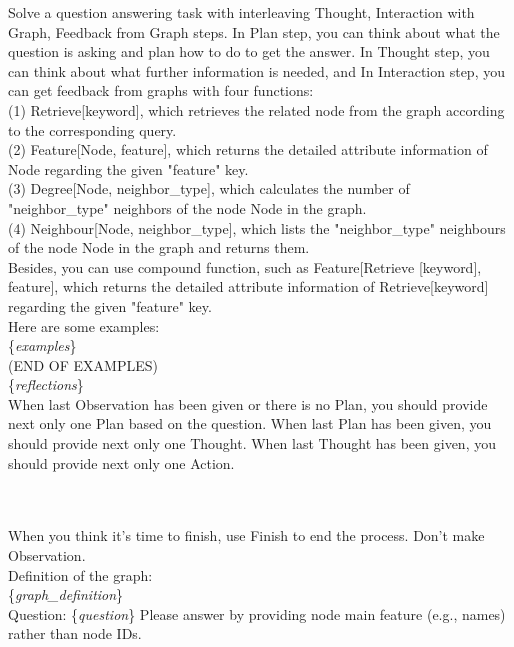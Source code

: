 \documentclass[11pt]{article}
\begin{document}
\begin{tcolorbox}[colback=white!10!white, colframe=blue!30!black, title=Reasoning Prompts, boxrule=1pt]
\justifying
\noindent
Solve a question answering task with interleaving Thought, Interaction with Graph, Feedback from Graph steps. In Plan step, you can think about what the question is asking and plan how to do to get the answer. In Thought step, you can think about what further information is needed, and In Interaction step, you can get feedback from graphs with four functions: \\
(1) Retrieve[keyword], which retrieves the related node from the graph according to the corresponding query.\\
(2) Feature[Node, feature], which returns the detailed attribute information of Node regarding the given "feature" key.\\
(3) Degree[Node, neighbor\_type], which calculates the number of "neighbor\_type" neighbors of the node Node in the graph.\\
(4) Neighbour[Node, neighbor\_type], which lists the "neighbor\_type" neighbours of the node Node in the graph and returns them.\\
Besides, you can use compound function, such as Feature[Retrieve [keyword], feature], which returns the detailed attribute information of Retrieve[keyword] regarding the given "feature" key.\\
Here are some examples:\\
\{\textit{examples}\}\\
(END OF EXAMPLES)\\
\{\textit{reflections}\}\\
When last Observation has been given or there is no Plan, you should provide next only one Plan based on the question. When last Plan has been given, you should provide next only one Thought. When last Thought has been given, you should provide next only one Action.\\
\mbox{}\\
\mbox{}\\
\end{tcolorbox}

\begin{tcolorbox}[colback=white!10!white, colframe=blue!30!black, title=, boxrule=1pt]
\justifying
\noindent
When you think it's time to finish, use Finish to end the process. Don't make Observation.\\
Definition of the graph: \\\{\textit{graph\_definition}\}\\
Question: \{\textit{question}\} Please answer by providing node main feature (e.g., names) rather than node IDs.
\end{tcolorbox}
\end{document}

